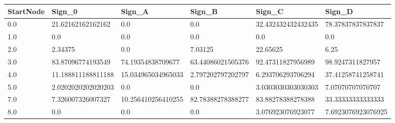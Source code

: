 \begin{tabular}{llllll}
\hline
StartNode & Sign\_0 & Sign\_A & Sign\_B & Sign\_C & Sign\_D \\ \hline
0.0 & 21.62162162162162 & 0.0 & 0.0 & 32.432432432432435 & 78.37837837837837 \\
1.0 & 0.0 & 0.0 & 0.0 & 0.0 & 0.0 \\
2.0 & 2.34375 & 0.0 & 7.03125 & 22.65625 & 6.25 \\
3.0 & 83.87096774193549 & 74.19354838709677 & 63.44086021505376 & 92.47311827956989 & 98.9247311827957 \\
4.0 & 11.188811188811188 & 15.034965034965033 & 2.797202797202797 & 6.293706293706294 & 37.41258741258741 \\
5.0 & 2.0202020202020203 & 0.0 & 0.0 & 3.0303030303030303 & 7.07070707070707 \\
7.0 & 7.326007326007327 & 10.256410256410255 & 82.78388278388277 & 83.88278388278388 & 33.33333333333333 \\
8.0 & 0.0 & 0.0 & 0.0 & 3.076923076923077 & 7.6923076923076925 \\
\hline
\end{tabular}

